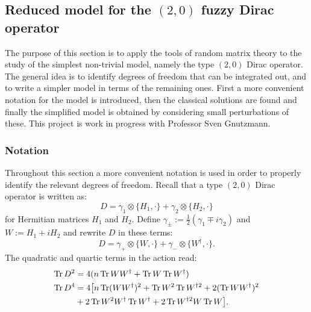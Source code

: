
\subsection{Reduced model for the $(2,0)$ fuzzy Dirac operator}
The purpose of this section is to apply the tools of random matrix theory to the study of the simplest non-trivial model, namely the type $(2,0)$ Dirac operator. The general idea is to identify degrees of freedom that can be integrated out, and to write a simpler model in terms of the remaining ones.\newline
First a more convenient notation for the model is introduced, then the classical solutions are found and finally the simplified model is obtained by considering small perturbations of these.\newline
This project is work in progress with Professor Sven Gnutzmann.

\subsubsection{Notation}
Throughout this section a more convenient notation is used in order to properly identify the relevant degrees of freedom.\newline
Recall that a type $(2,0)$ Dirac operator is written as:
\begin{equation}
D = \gamma_1 \otimes \{H_1, \cdot \} + \gamma_2 \otimes \{H_2, \cdot \}
\end{equation}
for Hermitian matrices $H_1$ and $H_2$. Define $\gamma_{\pm} := \frac{1}{2}(\gamma_1 \mp i \gamma_2)$ and $W := H_1 + i H_2$ and rewrite $D$ in these terms:
\begin{equation}
D = \gamma_+ \otimes \{ W, \cdot \} + \gamma_- \otimes \{ W^\dagger, \cdot \}.
\end{equation}
The quadratic and quartic terms in the action read:
\begin{align}
\operatorname{Tr} D^2 &= 4 (n \operatorname{Tr} W W^{\dagger} + \operatorname{Tr} W \operatorname{Tr} W^{\dagger}) \\ 
\operatorname{Tr} D^4 &= 4 \big[ n \operatorname{Tr}(W W^\dagger)^2 + \operatorname{Tr} W^2 \operatorname{Tr} W^{\dagger 2} + 2 (\operatorname{Tr} W W^\dagger)^2 \notag \\ 
&+ 2 \operatorname{Tr} W^2 W^\dagger \operatorname{Tr} W^\dagger + 2 \operatorname{Tr} W^{\dagger 2} W \operatorname{Tr} W \big].
\end{align}


